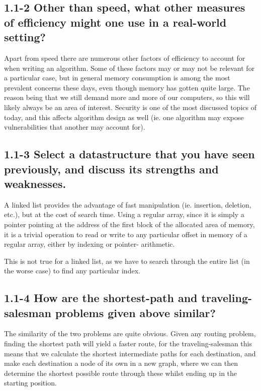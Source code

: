 \documentclass[11pt,english]{article}
\begin{document}

\subsection*{1.1-2 \mdseries Other than speed, what other measures of
efficiency might one use in a real-world setting?}
Apart from speed there are numerous other factors of efficiency to account for
when writing an algorithm. Some of these factors may or may not be relevant for
a particular case, but in general memory consumption is among the most
prevalent concerns these days, even though memory has gotten quite large. The
reason being that we still demand more and more of our computers, so this will
likely always be an area of interest. Security is one of the most discussed
topics of today, and this affects algorithm design as well (ie. one algorithm
may expose vulnerabilities that another may account for).

\subsection*{1.1-3 \mdseries Select a datastructure that you have seen
previously, and discuss its strengths and weaknesses.}
A linked list provides the advantage of fast manipulation (ie. insertion,
deletion, etc.), but at the cost of search time. Using a regular array, since
it is simply a pointer pointing at the address of the first block of the
allocated area of memory, it is a trivial operation to read or write to any
particular offset in memory of a regular array, either by indexing or pointer-
arithmetic.

This is not true for a linked list, as we have to search through the entire
list (in the worse case) to find any particular index.

\subsection*{1.1-4 \mdseries How are the shortest-path and traveling-salesman
problems given above similar?}
The similarity of the two problems are quite obvious. Given any routing
problem, finding the shortest path will yield a faster route, for the
traveling-salesman this means that we calculate the shortest intermediate
paths for each destination, and make each destination a node of its own in a
new graph, where we can then determine the shortest possible route through
these whilst ending up in the starting position.
\end{document}
